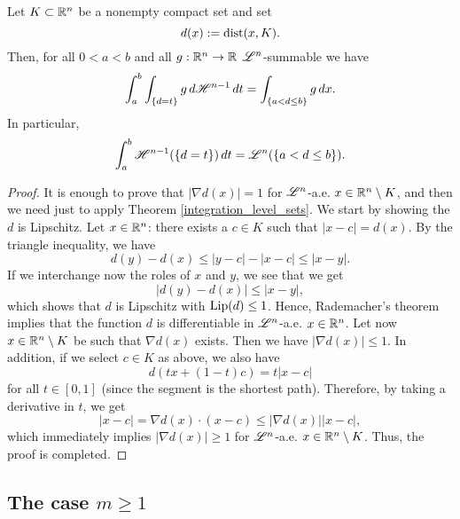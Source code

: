 \begin{theorem} \label{integration_distance_function}
Let $K\subset \mathbb{R}^{n}$ be a nonempty compact set and set $$d(x):= {\rm dist}(x, K).$$
Then, for all $0 < a < b$ and all $g : \mathbb{R}^{n} \to \mathbb{R}$ $\mathscr{L}^{n}$-summable we have
\begin{equation*}
\int_{a}^{b} \int_{\{ d = t\}} g \, d \mathscr{H}^{n - 1} \, dt = \int_{\{ a < d \le b\}} g \, dx.
\end{equation*}
In particular,
\begin{equation*}
\int_{a}^{b} \mathscr{H}^{n - 1}(\{d = t\}) \, dt = \mathscr{L}^{n}(\{ a < d \le b\}).
\end{equation*}
\end{theorem}
\begin{proof}
It is enough to prove that $|\nabla d(x)| = 1$ for $\mathscr{L}^{n}$-a.e. $x \in \mathbb{R}^{n} \setminus K$, and then we need just to apply Theorem \ref{integration_level_sets}. We start by showing the $d$ is Lipschitz. Let $x \in \mathbb{R}^{n}$: there exists a $c \in K$ such that $|x - c| = d(x)$. By the triangle inequality, we have
\begin{equation*}
d(y) - d(x) \le |y - c| - |x - c| \le |x - y|.
\end{equation*}
If we interchange now the roles of $x$ and $y$, we see that we get 
\begin{equation*}
|d(y) - d(x)| \le |x - y|,
\end{equation*}
which shows that $d$ is Lipschitz with $\operatorname{Lip}(d) \le 1$. Hence, Rademacher's theorem implies that the function $d$ is differentiable in $\mathscr{L}^{n}$-a.e. $x \in \mathbb{R}^n$. Let now $x \in \mathbb{R}^{n} \setminus K$ be such that $\nabla d(x)$ exists. Then we have $|\nabla d(x)| \le 1$. In addition, if we select $c \in K$ as above, we also have
\begin{equation*}
d(tx + (1 - t)c) = t |x - c|
\end{equation*}
for all $t \in [0, 1]$ (since the segment is the shortest path). Therefore, by taking a derivative in $t$, we get
\begin{equation*}
|x - c| = \nabla d(x) \cdot (x - c) \le |\nabla d(x)| |x - c|,
\end{equation*}
which immediately implies $|\nabla d(x)| \ge 1$ for $\mathscr{L}^{n}$-a.e. $x \in \mathbb{R}^{n} \setminus K$. Thus, the proof is completed.
\end{proof}

\subsection{The case $m \ge 1$}

